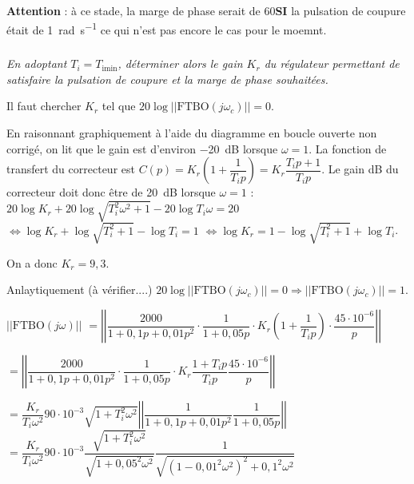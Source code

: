 \documentclass[10pt,fleqn]{article} %
\begin{document}
\begin{multicols}{2}
\begin{corrige}
 \begin{warn}
\textbf{Attention} : à ce stade, la marge de phase serait de 60\degres \textbf{SI} la pulsation de  coupure était de \SI{1}{rad.s^{-1}} ce qui n'est pas encore le cas pour le moemnt.
 \end{warn}
 
\end{corrige}
\else
\fi


\subparagraph{}\textit{En adoptant $T_{i}=T_{\text{imin}}$, déterminer alors le gain $K_r$ du régulateur permettant de satisfaire la pulsation de coupure et la marge de phase souhaitées.}

\begin{methode}
Il faut chercher $K_r$ tel que $20\log||\text{FTBO}(j\omega_c)||=0$.
\end{methode}
\ifprof


\ifprof
\begin{corrige}
En raisonnant graphiquement à l'aide du diagramme en boucle ouverte non corrigé, on lit que le gain est d'environ \SI{-20}{dB} lorsque $\omega=1$. La fonction de transfert du correcteur est 
$C(p)=K_r  \left(1+\dfrac{1}{T_i p} \right)=K_r  \dfrac{T_i p+1}{T_i p} $. Le gain dB du correcteur doit donc être de \SI{20}{dB} lorsque $\omega=1$ :
$20\log K_r  +20\log \sqrt{T_i^2 \omega^2 + 1}- 20\log T_i \omega =20$
$\Leftrightarrow \log K_r  +\log \sqrt{T_i^2  + 1}- \log T_i  =1$
$\Leftrightarrow \log K_r   =1-\log \sqrt{T_i^2  + 1}+ \log T_i $. 

On a donc $K_r = 9,3$. 

\vspace{1cm}
Anlaytiquement (à vérifier....)
$20\log||\text{FTBO}(j\omega_c)||=0 \Rightarrow ||\text{FTBO}(j\omega_c)||=1$.

$\left|\left| \text{FTBO}\left( j \omega\right)\right|\right|$ 
$ = \left|\left|
{\dfrac{2000}{1+0,1p+0,01p^2}}
\cdot
{\dfrac{1}{1+0,05p}}
\cdot 
{K_r}
 \left(1+\dfrac{1}{T_i p} \right) \cdot 
\dfrac{45\cdot 10^{-6}}{p}
\right|\right| $

$ = \left|\left|
{\dfrac{2000}{1+0,1p+0,01p^2}}
\cdot
{\dfrac{1}{1+0,05p}}
\cdot 
{K_r}
 \dfrac{1+T_i p}{T_i p} 
\dfrac{45\cdot 10^{-6}}{p}
\right|\right| $

$ =  \dfrac{K_r}{T_i\omega^2}  90\cdot 10^{-3}  \sqrt{1+T_i^2\omega^2}\left|\left|
\dfrac{1}{1+0,1p+0,01p^2}
\dfrac{1}{1+0,05p}
\right|\right| $
$ =  \dfrac{K_r}{T_i\omega^2}  90\cdot 10^{-3}  
\dfrac{\sqrt{1+T_i^2\omega^2}}{\sqrt{1+0,05^2 \omega^2}}
\dfrac{1}{\sqrt{\left(1-0,01^2\omega^2\right)^2+0,1^2\omega^2}} $


\end{corrige}
\end{multicols}
\end{document}
